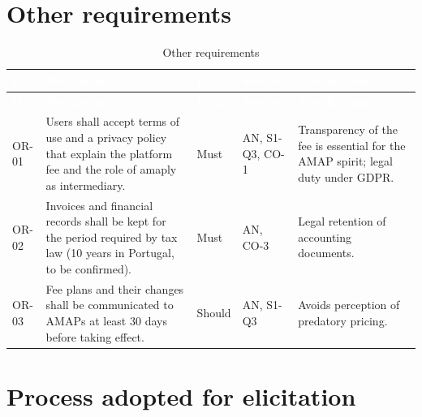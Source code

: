 \documentclass[11pt,a4paper]{article}
\begin{document}
\section{Other requirements}

{\footnotesize
\begin{longtable}{>{\raggedright\arraybackslash\hspace{0pt}}p{}>{\raggedright\arraybackslash\hspace{0pt}}p{}>{\raggedright\arraybackslash\hspace{0pt}}p{}>{\raggedright\arraybackslash\hspace{0pt}}p{}>{\raggedright\arraybackslash\hspace{0pt}}p{}}
\caption{Other requirements}\\
\rowcolor{hdr}\textcolor{white}{\textbf{ID}} & \textcolor{white}{\textbf{Requirement}} & \textcolor{white}{\textbf{Prio.}} & \textcolor{white}{\textbf{Source}} & \textcolor{white}{\textbf{Justification}} \\ \endfirsthead
\rowcolor{hdr}\textcolor{white}{\textbf{ID}} & \textcolor{white}{\textbf{Requirement}} & \textcolor{white}{\textbf{Prio.}} & \textcolor{white}{\textbf{Source}} & \textcolor{white}{\textbf{Justification}} \\ \endhead
OR-01 & Users shall accept terms of use and a privacy policy that explain the platform fee and the role of amaply as intermediary. & Must & AN, S1-Q3, CO-1 & Transparency of the fee is essential for the AMAP spirit; legal duty under GDPR. \\ \hline
OR-02 & Invoices and financial records shall be kept for the period required by tax law (10 years in Portugal, to be confirmed). & Must & AN, CO-3 & Legal retention of accounting documents. \\ \hline
OR-03 & Fee plans and their changes shall be communicated to AMAPs at least 30 days before taking effect. & Should & AN, S1-Q3 & Avoids perception of predatory pricing. \\ \hline
\end{longtable}}

\section{Process adopted for elicitation}
\end{document}
